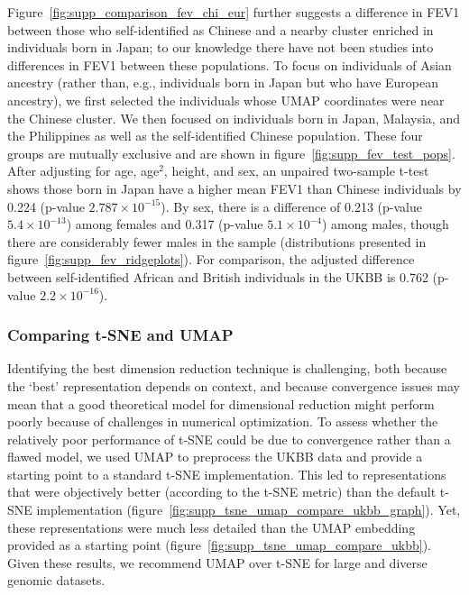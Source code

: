 \documentclass[12pt]{pnas-new}
\newcommand{\sgcomment}[1]{{\textcolor{blue}{SG: #1}}}
\newcommand{\adpcomment}[1]{{\textcolor{orange}{ADP: #1}}}
\begin{document}
Figure~\ref{fig:supp_comparison_fev_chi_eur} further suggests a difference in FEV1 between those who self-identified as Chinese and a nearby cluster enriched in individuals born in Japan; to our knowledge there have not been studies into differences in FEV1 between these populations. To focus on individuals of Asian ancestry (rather than, e.g., individuals born in Japan but who have European ancestry), we first selected the individuals whose UMAP coordinates were near the Chinese cluster. We then focused on individuals born in Japan, Malaysia, and the Philippines as well as the self-identified Chinese population. These four groups are mutually exclusive and are shown in figure~\ref{fig:supp_fev_test_pops}. After adjusting for age, age$^2$, height, and sex, an unpaired two-sample t-test shows those born in Japan have a higher mean FEV1 than Chinese individuals by 0.224 (p-value $2.787\times 10^{-15}$). By sex, there is a difference of 0.213 (p-value $5.4\times 10^{-13}$) among females and 0.317 (p-value $5.1\times 10^{-4}$) among males, though there are considerably fewer males in the sample (distributions presented in figure~\ref{fig:supp_fev_ridgeplots}). For comparison, the adjusted difference between self-identified African and British individuals in the UKBB is 0.762 (p-value $2.2\times 10^{-16}$).

\subsubsection*{Comparing t-SNE and UMAP}
Identifying the best dimension reduction technique is challenging, both because the `best' representation depends on context, and because convergence issues may mean that a good theoretical model for dimensional reduction might perform poorly because of challenges in numerical optimization. To assess whether the relatively poor performance of t-SNE could be due to convergence rather than a flawed model, we used UMAP to preprocess the UKBB data and provide a starting point to a standard t-SNE implementation. This led to representations that were objectively better (according to the t-SNE metric) than the default t-SNE implementation (figure~\ref{fig:supp_tsne_umap_compare_ukbb_graph}). Yet, these representations were much less detailed than the UMAP embedding provided as a starting point (figure~\ref{fig:supp_tsne_umap_compare_ukbb}).  Given these results, we recommend UMAP over t-SNE for large and diverse genomic datasets.
\end{document}
